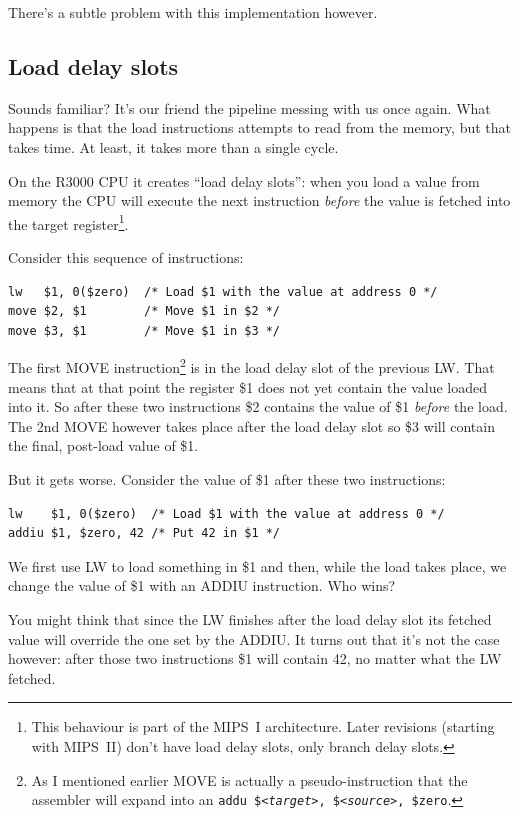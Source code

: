 \documentclass[a4paper]{article}
\newcommand{\code}[1] {\texttt{#1}}
\begin{document}
There's a subtle problem with this implementation however.

\subsection{Load delay slots}

Sounds familiar? It's our friend the pipeline messing with us once
again. What happens is that the load instructions attempts to read
from the memory, but that takes time. At least, it takes more than a
single cycle.

On the R3000 CPU it creates ``load delay slots'': when you load a
value from memory the CPU will execute the next instruction
\emph{before} the value is fetched into the target
register\footnote{This behaviour is part of the MIPS~I
  architecture. Later revisions (starting with MIPS~II) don't
  have load delay slots, only branch delay slots.}.

Consider this sequence of instructions:

\begin{lstlisting}[language=assembly]
lw   $1, 0($zero)  /* Load $1 with the value at address 0 */
move $2, $1        /* Move $1 in $2 */
move $3, $1        /* Move $1 in $3 */
\end{lstlisting}

The first MOVE instruction\footnote{As I mentioned earlier MOVE is
  actually a pseudo-instruction that the assembler will expand into an
  \code{addu \$<\emph{target}>, \$<\emph{source}>, \$zero}.} is in
the load delay slot of the previous LW. That means that at that point
the register \$1 does not yet contain the value loaded into it. So
after these two instructions \$2 contains the value of \$1
\emph{before} the load. The 2nd MOVE however takes place after the
load delay slot so \$3 will contain the final, post-load value of \$1.

But it gets worse. Consider the value of \$1 after these two
instructions:

\begin{lstlisting}[language=assembly]
lw    $1, 0($zero)  /* Load $1 with the value at address 0 */
addiu $1, $zero, 42 /* Put 42 in $1 */
\end{lstlisting}

We first use LW to load something in \$1 and then, while the load
takes place, we change the value of \$1 with an ADDIU instruction. Who
wins?

You might think that since the LW finishes after the load delay slot
its fetched value will override the one set by the ADDIU. It turns out
that it's not the case however: after those two instructions \$1 will
contain 42, no matter what the LW fetched.
\end{document}
